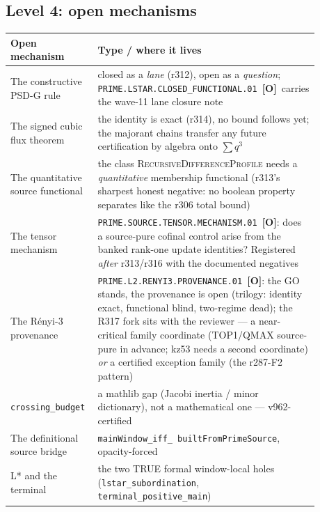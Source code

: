 \documentclass[11pt]{article}
\newcommand{\mO}{\textcolor{openred}{\textbf{[O]}}}
\theoremstyle{definition}
\theoremstyle{remark}
\begin{document}
\subsection{Level 4: open mechanisms}

\begin{center}\small
\begin{tabular}{@{}p{0.40\linewidth}p{0.48\linewidth}@{}}
\toprule
\textbf{Open mechanism} & \textbf{Type / where it lives}\\
\midrule
The constructive PSD-G rule & closed as a \emph{lane} (r312), open
as a \emph{question}; \texttt{PRIME.LSTAR.CLOSED\_FUNCTIONAL.01}~\mO\
carries the wave-11 lane closure note\\
The signed cubic flux theorem & the identity is exact (r314), no
bound follows yet; the majorant chains transfer any future
certification by algebra onto $\sum q^3$\\
The quantitative source functional & the class
\textsc{RecursiveDifferenceProfile} needs a \emph{quantitative}
membership functional (r313's sharpest honest negative: no boolean
property separates like the r306 total bound)\\
The tensor mechanism & \texttt{PRIME.SOURCE.TENSOR.MECHANISM.01}~\mO:
does a source-pure cofinal control arise from the banked rank-one
update identities?  Registered \emph{after} r313/r316 with the
documented negatives\\
The R\'enyi-3 provenance & \texttt{PRIME.L2.RENYI3.PROVENANCE.01}~\mO:
the GO stands, the provenance is open (trilogy: identity exact,
functional blind, two-regime dead); the R317 fork sits with the
reviewer --- a near-critical family coordinate (TOP1/QMAX
source-pure in advance; kz53 needs a second coordinate) \emph{or} a
certified exception family (the r287-F2 pattern)\\
\texttt{crossing\_budget} & a mathlib gap (Jacobi inertia / minor
dictionary), not a mathematical one --- v962-certified\\
The definitional source bridge & \texttt{mainWindow\_iff\_
builtFromPrimeSource}, opacity-forced\\
L* and the terminal & the two TRUE formal window-local holes
(\texttt{lstar\_subordination}, \texttt{terminal\_positive\_main})\\
\bottomrule
\end{tabular}
\end{center}
\end{document}
